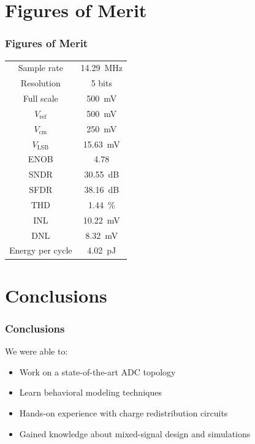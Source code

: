 \documentclass{beamer}
\newcommand*{\subb}[1]{\ensuremath{_{\mathrm{#1}}}}
\begin{document}
  \section{Figures of Merit}
  \begin{frame}
    \frametitle{Figures of Merit}
    \centering
    \begin{tabular}[]{cc}
    \toprule
    Sample rate      & \SI{14.29}{\MHz}\\
    Resolution       & 5 bits\\
    Full scale       & \SI{500}{\mV}\\
    $V\subb{ref}$    & \SI{500}{\mV}\\
    $V\subb{cm}$     & \SI{250}{\mV}\\
    $V\subb{LSB}$    & \SI{15.63}{\mV}\\\midrule
    ENOB             & \num{4.78}\\
    SNDR             & \SI{30.55}{dB}\\
    SFDR             & \SI{38.16}{dB}\\
    THD              & \SI{1.44}{\percent}\\
    INL              & \alert{\SI{10.22}{\mV}}\\
    DNL              & \alert{\SI{8.32}{\mV}}\\
    Energy per cycle & \SI{4.02}{\pico\joule}\\\bottomrule
    \end{tabular}
  \end{frame}

  \section{Conclusions}
  \begin{frame}
    \frametitle{Conclusions}
    We were able to:\vspace*{2em}
    \begin{itemize}
    \item Work on a state-of-the-art ADC topology
    \item<2-> Learn behavioral modeling techniques
    \item<3-> Hands-on experience with charge redistribution circuits
    \item<4-> Gained knowledge about mixed-signal design and simulations
    \end{itemize}
  \end{frame}
\end{document}
